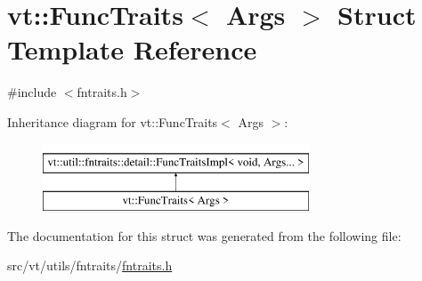 \hypertarget{structvt_1_1_func_traits}{}\section{vt\+:\+:Func\+Traits$<$ Args $>$ Struct Template Reference}
\label{structvt_1_1_func_traits}


{\ttfamily \#include $<$fntraits.\+h$>$}

Inheritance diagram for vt\+:\+:Func\+Traits$<$ Args $>$\+:\begin{figure}[H]
\begin{center}
\leavevmode
\includegraphics[height=2.000000cm]{structvt_1_1_func_traits}
\end{center}
\end{figure}


The documentation for this struct was generated from the following file\+:\begin{DoxyCompactItemize}
\item 
src/vt/utils/fntraits/\hyperlink{fntraits_8h}{fntraits.\+h}\end{DoxyCompactItemize}
